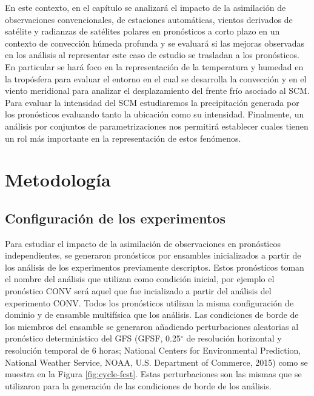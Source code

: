 \documentclass[12pt,oneside,a4paper]{reedthesis}
\begin{document}
En este contexto, en el capítulo se analizará el impacto de la asimilación de observaciones convencionales, de
estaciones automáticas, vientos derivados de satélite y radianzas de satélites polares en pronósticos a corto plazo en un contexto de convección húmeda profunda y se evaluará si las mejoras observadas en los análisis al representar este caso de estudio se trasladan a los pronósticos. En particular se hará foco en la representación de la temperatura y humedad en la tropósfera para evaluar el entorno en el cual se desarrolla la convección y en el viento meridional para analizar el desplazamiento del frente frío asociado al SCM. Para evaluar la intensidad del SCM estudiaremos la precipitación generada por los pronósticos evaluando tanto la ubicación como su intensidad. Finalmente, un análisis por conjuntos de parametrizaciones nos permitirá establecer cuales tienen un rol más importante en la representación de estos fenómenos.

\hypertarget{metodologuxeda-1}{%
\section{Metodología}\label{metodologuxeda-1}}

\hypertarget{configuraciuxf3n-de-los-experimentos}{%
\subsection{Configuración de los experimentos}\label{configuraciuxf3n-de-los-experimentos}}

Para estudiar el impacto de la asimilación de observaciones en pronósticos independientes, se generaron pronósticos por ensambles inicializados a partir de los análisis de los experimentos previamente descriptos. Estos pronósticos toman el nombre del análisis que utilizan como condición inicial, por ejemplo el pronóstico CONV será aquel que fue incializado a partir del análisis del experimento CONV. Todos los pronósticos utilizan la misma configuración de dominio y de ensamble multifísica que los análisis. Las condiciones de borde de los miembros del ensamble se generaron añadiendo perturbaciones aleatorias al pronóstico determinístico del GFS (GFSF, 0.25\(^{\circ}\) de resolución horizontal y resolución temporal de 6 horas; National Centers for Environmental Prediction, National Weather Service, NOAA, U.S. Department of Commerce, 2015) como se muestra en la Figura \ref{fig:cycle-fcst}. Estas perturbaciones son las mismas que se utilizaron para la generación de las condiciones de borde de los análisis.
\end{document}

